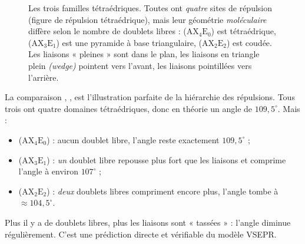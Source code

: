 \documentclass[11pt,a4paper]{article}
\newcommand{\AX}[2]{\ensuremath{\mathrm{AX_{#1}E_{#2}}}}
\newcommand{\ball}[5]{\shade[ball color=#2] (#1) circle (#3);%
  \node[font=\footnotesize\bfseries,text=#4] at (#1){#5};}
\newcommand{\pbond}[2]{\draw[bondcol,line width=1.6pt] (#1)--(#2);}
\newcommand{\lobe}[3]{\begin{scope}[shift={(#1)},rotate=#2]
  \shade[ball color=lonepair!55,opacity=0.9] (#3,0) ellipse (0.34 and 0.20);
  \end{scope}}
\begin{document}
\begin{figure}[h]
\caption{Les trois familles tétraédriques. Toutes ont \emph{quatre} sites de répulsion (figure de
répulsion tétraédrique), mais leur géométrie \emph{moléculaire} diffère selon le nombre de
doublets libres :  (\AX{4}{0}) est tétraédrique,  (\AX{3}{1}) est une pyramide à
base triangulaire,  (\AX{2}{2}) est coudée. Les liaisons « pleines » sont dans le plan,
les liaisons en triangle plein \emph{(wedge)} pointent vers l'avant, les liaisons pointillées
vers l'arrière.}
\label{fig:tetraedrique}
\end{figure}

\begin{exemple}
La comparaison , ,  est l'illustration parfaite de la hiérarchie des
répulsions. Tous trois ont quatre domaines tétraédriques, donc en théorie un angle de
$109{,}5^\circ$. Mais :
\begin{itemize}[leftmargin=1.5em,topsep=2pt,itemsep=3pt]
  \item {} (\AX{4}{0}) : aucun doublet libre, l'angle  reste exactement
        $109{,}5^\circ$ ;
  \item {} (\AX{3}{1}) : \emph{un} doublet libre repousse plus fort que les liaisons et
        comprime l'angle  à environ $107^\circ$ ;
  \item {} (\AX{2}{2}) : \emph{deux} doublets libres compriment encore plus, l'angle
         tombe à $\approx 104{,}5^\circ$.
\end{itemize}
Plus il y a de doublets libres, plus les liaisons sont « tassées » : l'angle diminue
régulièrement. C'est une prédiction directe et vérifiable du modèle VSEPR.
\end{exemple}
\end{document}
